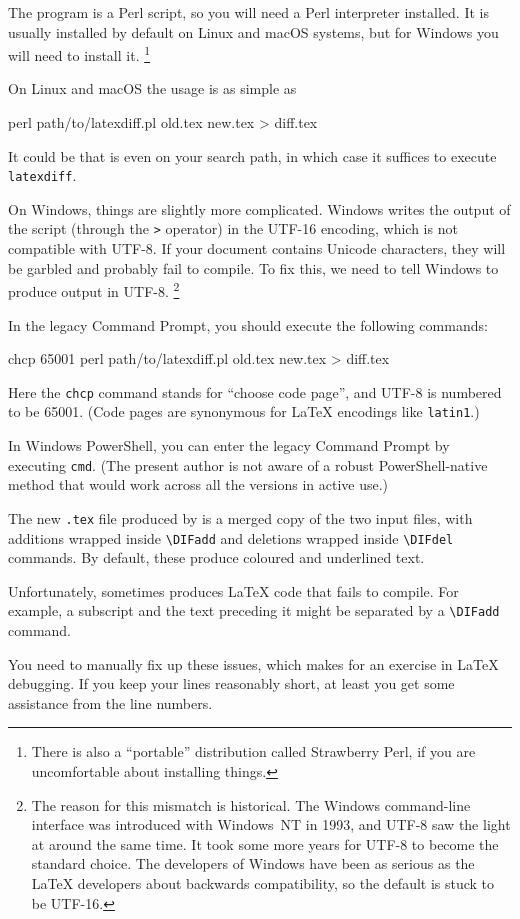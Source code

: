 The  program is a Perl script,
so you will need a Perl interpreter installed.
It is usually installed by default on Linux and macOS systems,
but for Windows you will need to install it.%
\footnote{There is also a ``portable'' distribution called Strawberry Perl,
if you are uncomfortable about installing things.}

On Linux and macOS the usage is as simple as
\begin{ExampleCode}
perl path/to/latexdiff.pl old.tex new.tex > diff.tex
\end{ExampleCode}
It could be that  is even on your search path,
in which case it suffices to execute \verb|latexdiff|.

On Windows, things are slightly more complicated.
Windows writes the output of the script (through the \verb|>| operator)
in the UTF-16 encoding, which is not compatible with UTF-8.
If your document contains Unicode characters,
they will be garbled and probably fail to compile.
To fix this, we need to tell Windows to produce output in UTF-8.%
\footnote{The reason for this mismatch is historical.
The Windows command-line interface was introduced with Windows~NT in 1993,
and UTF-8 saw the light at around the same time.
It took some more years for UTF-8 to become the standard choice.
The developers of Windows have been as serious as the \LaTeX{} developers about backwards compatibility,
so the default is stuck to be UTF-16.}

In the legacy Command Prompt, you should execute the following commands:
\begin{ExampleCode}
chcp 65001
perl path/to/latexdiff.pl old.tex new.tex > diff.tex
\end{ExampleCode}
Here the \verb|chcp| command stands for ``choose code page'',
and UTF-8 is numbered to be 65001.
(Code pages are synonymous for \LaTeX{} encodings like \verb|latin1|.)

In Windows PowerShell, you can enter the legacy Command Prompt by executing \verb|cmd|.
(The present author is not aware of a robust PowerShell-native method that would work across
all the versions in active use.)

The new \verb|.tex| file produced by 
is a merged copy of the two input files,
with additions wrapped inside \verb|\DIFadd|
and deletions wrapped inside \verb|\DIFdel| commands.
By default, these produce coloured and underlined text.

\begin{gotcha}
Unfortunately,  sometimes produces \LaTeX{} code that fails to compile.
For example, a subscript and the text preceding it might be separated by a \verb|\DIFadd| command.

You need to manually fix up these issues,
which makes for an exercise in \LaTeX{} debugging.
If you keep your lines reasonably short,
at least you get some assistance from the line numbers.
\end{gotcha}

